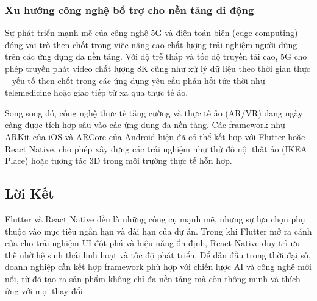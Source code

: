\subsubsection{Xu hướng công nghệ bổ trợ cho nền tảng di động}

\indent Sự phát triển mạnh mẽ của công nghệ 5G và điện toán biên (edge computing) đóng vai trò then chốt trong việc nâng cao chất lượng trải nghiệm người dùng trên các ứng dụng đa nền tảng. Với độ trễ thấp và tốc độ truyền tải cao, 5G cho phép truyền phát video chất lượng 8K cũng như xử lý dữ liệu theo thời gian thực – yếu tố then chốt trong các ứng dụng yêu cầu phản hồi tức thời như telemedicine hoặc giao tiếp từ xa qua thực tế ảo.

\vspace{0.5em}

\indent Song song đó, công nghệ thực tế tăng cường và thực tế ảo (AR/VR) đang ngày càng được tích hợp sâu vào các ứng dụng đa nền tảng. Các framework như ARKit của iOS và ARCore của Android hiện đã có thể kết hợp với Flutter hoặc React Native, cho phép xây dựng các trải nghiệm như thử đồ nội thất ảo (IKEA Place) hoặc tương tác 3D trong môi trường thực tế hỗn hợp.

\subsection{Lời Kết}

\indent Flutter và React Native đều là những công cụ mạnh mẽ, nhưng sự lựa chọn phụ thuộc vào mục tiêu ngắn hạn và dài hạn của dự án. Trong khi Flutter mở ra cánh cửa cho trải nghiệm UI đột phá và hiệu năng ổn định, React Native duy trì ưu thế nhờ hệ sinh thái linh hoạt và tốc độ phát triển. Để dẫn đầu trong thời đại số, doanh nghiệp cần kết hợp framework phù hợp với chiến lược AI và công nghệ mới nổi, từ đó tạo ra sản phẩm không chỉ đa nền tảng mà còn thông minh và thích ứng với mọi thay đổi.
